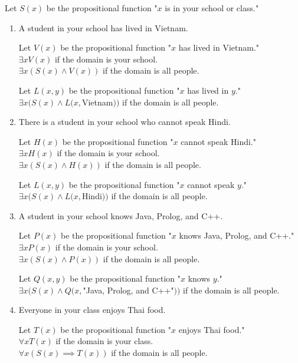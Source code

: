 \documentclass[11pt]{article}
\begin{document}
\begin{enumerate}[label=\textbf{\arabic*.}]
	Let $S(x)$ be the propositional function "$x$ is in your school or class."
	\begin{enumerate}[label=\textbf{\alph*)}]
		\item A student in your school has lived in Vietnam.
		
		Let $V(x)$ be the propositional function "$x$ has lived in Vietnam." \\
		$\exists xV(x)$ if the domain is your school. \\
		$\exists x(S(x) \land V(x))$ if the domain is all people.
		
		Let $L(x, y)$ be the propositional function "$x$ has lived in $y$." \\
		$\exists x(S(x) \land L(x, $Vietnam$))$ if the domain is all people.
		
		\item There is a student in your school who cannot speak Hindi.
		
		Let $H(x)$ be the propositional function "$x$ cannot speak Hindi." \\
		$\exists xH(x)$ if the domain is your school. \\
		$\exists x(S(x) \land H(x))$ if the domain is all people.
		
		Let $L(x, y)$ be the propositional function "$x$ cannot speak $y$." \\
		$\exists x(S(x) \land L(x, $Hindi$))$ if the domain is all people.
		
		\item A student in your school knows Java, Prolog, and C++.
		
		Let $P(x)$ be the propositional function "$x$ knows Java, Prolog, and C++." \\
		$\exists xP(x)$ if the domain is your school. \\
		$\exists x(S(x) \land P(x))$ if the domain is all people.
		
		Let $Q(x, y)$ be the propositional function "$x$ knows $y$." \\
		$\exists x(S(x) \land Q(x, $"Java, Prolog, and C++"$))$ if the domain is all people.
		
		\item Everyone in your class enjoys Thai food.
		
		Let $T(x)$ be the propositional function "$x$ enjoys Thai food." \\
		$\forall xT(x)$ if the domain is your class. \\
		$\forall x(S(x) \implies T(x))$ if the domain is all people.
		

\end{enumerate}
\end{enumerate}
\end{document}
